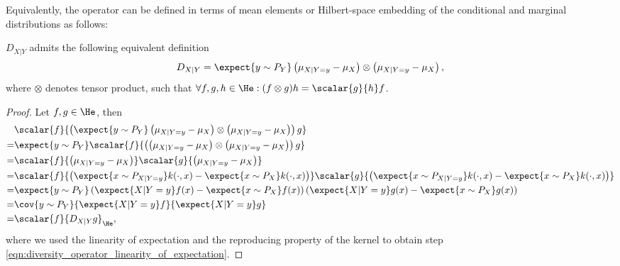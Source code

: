 Equivalently, the operator can be defined in terms of mean elements or Hilbert-space embedding of the conditional and marginal distributions as follows:

\begin{statement}
$D_{X\vert Y}$ admits the following equivalent definition
%
\begin{align}
	D_{X\vert Y} = \expect{y\sim P_Y} \left(\mu_{X\vert Y=y} - \mu_{X}\right) \otimes \left(\mu_{X\vert Y=y}  - \mu_{X} \right),
\end{align}
%
where $\otimes$ denotes tensor product, such that $\forall f,g,h\in\He: (f\otimes g)h = \scalar{g}{h}f$.

\begin{proof}
Let $f,g\in\He$, then
%
\begin{align}
	&\scalar{f}{ \left(\expect{y\sim P_Y}\left(\mu_{X\vert Y=y} - \mu_{X}\right) \otimes \left(\mu_{X\vert Y=y}  - \mu_{X} \right)\right) g}\\
	=&\expect{y\sim P_Y}\scalar{f}{ \left(\left(\mu_{X\vert Y=y} - \mu_{X}\right) \otimes \left(\mu_{X\vert Y=y}  - \mu_{X} \right)\right) g}\\
	=& \scalar{f}{\left(\mu_{X\vert Y=y} - \mu_{X}\right)}\scalar{g}{\left(\mu_{X\vert Y=y} - \mu_{X}\right)}\\
	=& \scalar{f}{\left(\expect{x\sim P_{X\vert Y=y}}k(\cdot,x) - \expect{x\sim P_X}k(\cdot,x)\right)}\scalar{g}{\left(\expect{x\sim P_{X\vert Y=y}}k(\cdot,x) - \expect{x\sim P_X}k(\cdot,x)\right)}\\
	=& \expect{y\sim P_Y} \left(\expect{X\vert Y=y} f(x) - \expect{x\sim P_X}f(x)\right)\left(\expect{X\vert Y=y} g(x) - \expect{x\sim P_X}g(x)\right)\label{eqn:diversity_operator_linearity_of_expectation}\\
	=& \cov{y\sim P_Y}{\expect{X\vert Y=y} f}{\expect{X\vert Y=y} g}\\
	=& \scalar{f}{D_{X\vert Y}g}_{\He},
\end{align}
%
where we used the linearity of expectation and the reproducing property of the kernel to obtain step \eqref{eqn:diversity_operator_linearity_of_expectation}.
\end{proof}
\end{statement}

